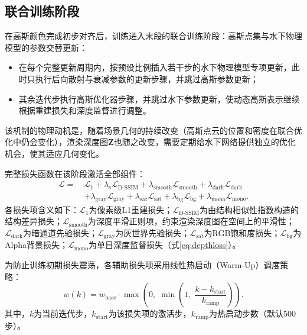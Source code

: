 \subsection{联合训练阶段}

在高斯颜色完成初步对齐后，训练进入末段的联合训练阶段：高斯点集与水下物理模型的参数交替更新：

\begin{itemize}
  \item 在每个完整更新周期内，按预设比例插入若干步的水下物理模型专项更新，此时只执行后向散射与衰减参数的更新步骤，并跳过高斯参数更新；
  \item 其余迭代步执行高斯优化器步骤，并跳过水下参数更新，使动态高斯表示继续根据重建损失和深度监督进行调整。
\end{itemize}

该机制的物理动机是，随着场景几何的持续改变（高斯点云的位置和密度在联合优化中仍会变化），渲染深度图$\mathbf{Z}$也随之改变，需要定期给水下网络提供独立的优化机会，使其适应几何变化。

完整损失函数在该阶段激活全部组件：
\begin{equation}
  \begin{aligned}
    \mathcal{L} =\ & \mathcal{L}_1 + \lambda_{\mathrm{s}}\mathcal{L}_{\mathrm{D}\mbox{-}\mathrm{SSIM}}
                  + \lambda_{\mathrm{smooth}}\mathcal{L}_{\mathrm{smooth}}
                  + \lambda_{\mathrm{dark}}\mathcal{L}_{\mathrm{dark}} \\
                & + \lambda_{\mathrm{gray}}\mathcal{L}_{\mathrm{gray}}
                  + \lambda_{\mathrm{sat}}\mathcal{L}_{\mathrm{sat}}
                  + \lambda_{\mathrm{bg}}\mathcal{L}_{\mathrm{bg}}
                  + \lambda_{\mathrm{mono}}\mathcal{L}_{\mathrm{mono}}.
  \end{aligned}
  \label{eq:lossfull}
\end{equation}
各损失项含义如下：$\mathcal{L}_1$为像素级L1重建损失；$\mathcal{L}_{\mathrm{D}\mbox{-}\mathrm{SSIM}}$为由结构相似性指数构造的结构差异损失；$\mathcal{L}_{\mathrm{smooth}}$为深度平滑正则项，约束渲染深度图在空间上的平滑性；$\mathcal{L}_{\mathrm{dark}}$为暗通道先验损失；$\mathcal{L}_{\mathrm{gray}}$为灰世界先验损失；$\mathcal{L}_{\mathrm{sat}}$为RGB饱和度损失；$\mathcal{L}_{\mathrm{bg}}$为Alpha背景损失；$\mathcal{L}_{\mathrm{mono}}$为单目深度监督损失（式\eqref{eq:depthloss}）。

为防止训练初期损失震荡，各辅助损失项采用线性热启动（Warm-Up）调度策略：
\begin{equation}
  w(k) = w_{\mathrm{base}} \cdot \max\!\left(0,\; \min\!\left(1,\; \frac{k - k_{\mathrm{start}}}{k_{\mathrm{ramp}}}\right)\right).
  \label{eq:warmup}
\end{equation}
其中，$k$为当前迭代步，$k_{\mathrm{start}}$为该损失项的激活步，$k_{\mathrm{ramp}}$为热启动步数（默认500步）。

